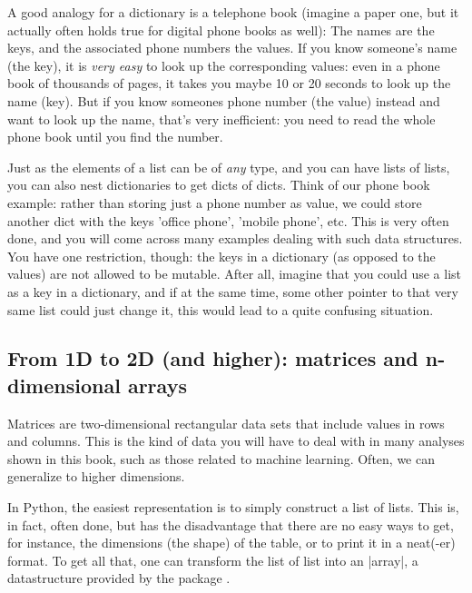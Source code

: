 
A good analogy for a dictionary is a telephone book (imagine a paper
one, but it actually often holds true for digital phone books as
well): The names are the keys, and the associated phone numbers the
values. If you know someone's name (the key), it is \emph{very easy}
to look up the corresponding values: even in a phone book of thousands
of pages, it takes you maybe 10 or 20 seconds to look up the name
(key). But if you know someones phone number (the value) instead and
want to look up the name, that's very inefficient: you need to read
the whole phone book until you find the number.

Just as the elements of a list can be of \emph{any} type, and you can
have lists of lists, you can also nest dictionaries to get dicts of
dicts. Think of our phone book example: rather than storing just a
phone number as value, we could store another dict with the keys
'office phone', 'mobile phone', etc. This is very often done, and you
will come across many examples dealing with such data structures.
You have one restriction, though: the keys in a dictionary (as opposed
to the values) are not allowed to be mutable. After all, imagine that
you could use a list as a key in a dictionary, and if at the same time,
some other pointer to that very same list could just change it, this
would lead to a quite confusing situation.




\subsection{From 1D to 2D (and higher): matrices and n-dimensional arrays}

Matrices are two-dimensional rectangular data sets that include values
in rows and columns. This is the kind of data you will have to deal
with in many analyses shown in this book, such as those related to
machine learning. Often, we can generalize to higher dimensions.


In Python, the easiest representation is to simply construct a list of
lists. This is, in fact, often done, but has the disadvantage that
there are no easy ways to get, for instance, the dimensions (the
shape) of the table, or to print it in a neat(-er) format. To get all
that, one can transform the list of list into an |array|, a
datastructure provided by the package .

